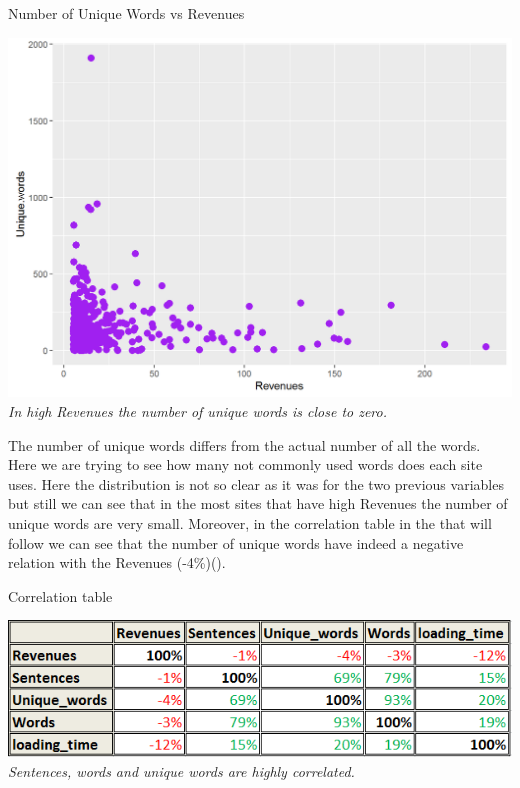 \documentclass{book}
\begin{document}
\begin{table}[H]
\centering
\caption{Number of Unique Words vs Revenues}
\begin{center}
\includegraphics[scale=0.4]{../R/photos/35_uw_rev.png}    \\
\textit{In high Revenues the number of unique words is close to zero.}
\end{center}
\end{table}
The number of unique words differs from the actual number of all the words. Here we are trying to see how many not commonly used words does each site uses. Here the distribution is not so clear as it was for the two previous variables but still we can see that in the most sites that have high Revenues the number of unique words are very small. Moreover, in the correlation table in the that will follow we can see that the number of unique words have indeed a negative relation with the Revenues (-4\%)(\pageref{lod}).
\begin{table}[H]
\centering
\caption{Correlation table}\label{lod}
\begin{center}
\includegraphics[scale=0.7]{../R/photos/38b_words_corr.png}    \\
\textit{Sentences, words and unique words are highly correlated.}
\end{center}
\end{table}
\end{document}
